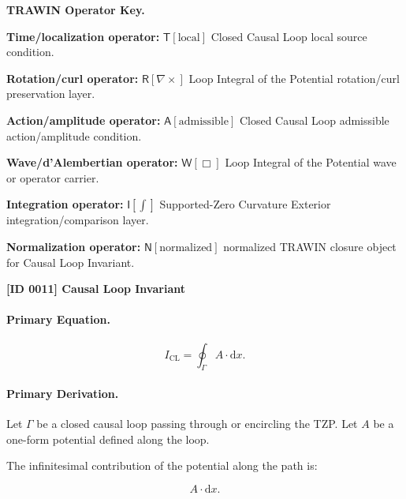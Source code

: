 \par\vspace{0.45\baselineskip}
\noindent\begin{minipage}[t]{\linewidth}
\begingroup
\small
\raggedright
\textbf{TRAWIN Operator Key.}\par
\noindent\textbf{Time/localization operator:} $\mathsf{T}\!\left[\mathrm{local}\right]$ Closed Causal Loop local source condition.\par
\noindent\textbf{Rotation/curl operator:} $\mathsf{R}\!\left[\nabla\times\right]$ Loop Integral of the Potential rotation/curl preservation layer.\par
\noindent\textbf{Action/amplitude operator:} $\mathsf{A}\!\left[\mathrm{admissible}\right]$ Closed Causal Loop admissible action/amplitude condition.\par
\noindent\textbf{Wave/d'Alembertian operator:} $\mathsf{W}\!\left[\Box\right]$ Loop Integral of the Potential wave or operator carrier.\par
\noindent\textbf{Integration operator:} $\mathsf{I}\!\left[\int\right]$ Supported-Zero Curvature Exterior integration/comparison layer.\par
\noindent\textbf{Normalization operator:} $\mathsf{N}\!\left[\mathrm{normalized}\right]$ normalized TRAWIN closure object for Causal Loop Invariant.\par
\endgroup
\end{minipage}

\clearpage
\noindent\textbf{[ID 0011] Causal Loop Invariant}\par
\vspace{0.35em}
\paragraph{Primary Equation.}
\begin{equation}
I_{\mathrm{CL}}
=
\oint_{\Gamma} A\cdot \mathrm{d}x .
\end{equation}

\paragraph{Primary Derivation.}
Let $\Gamma$ be a closed causal loop passing through or encircling the TZP.  
Let $A$ be a one-form potential defined along the loop.

The infinitesimal contribution of the potential along the path is:

\begin{equation}
A\cdot \mathrm{d}x .
\end{equation}

